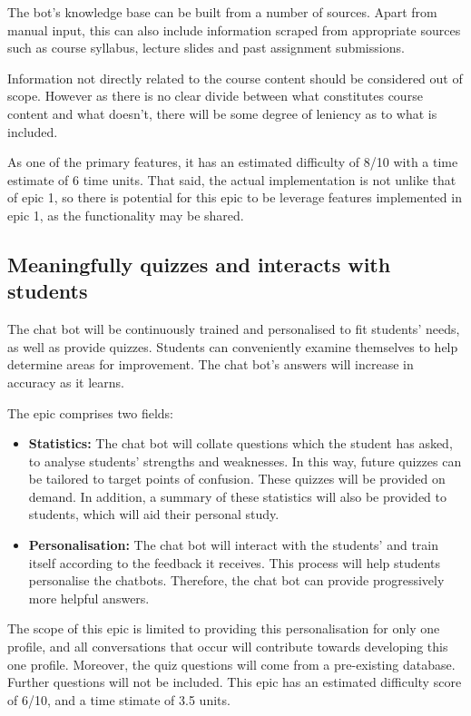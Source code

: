 \documentclass{article}
\begin{document}
The bot's knowledge base can be built from a number of sources. Apart from manual input, this can also include information scraped from appropriate sources such as course syllabus, lecture slides and past assignment submissions.

Information not directly related to the course content should be considered out of scope. However as there is no clear divide between what constitutes course content and what doesn't, there will be some degree of leniency as to what is included.

As one of the primary features, it has an estimated difficulty of 8/10 with a time estimate of 6 time units. That said, the actual implementation is not unlike that of epic 1, so there is potential for this epic to be leverage features implemented in  epic 1, as the functionality may be shared.

\subsection{Meaningfully quizzes and interacts with students}
The chat bot will be continuously trained and personalised to fit students' needs, as well as provide quizzes. Students can conveniently examine themselves to help determine areas for improvement. The chat bot's answers will increase in accuracy as it learns.

The epic comprises two fields:
\begin{itemize}
  \item \textbf{Statistics:} The chat bot will collate questions which the student has asked, to analyse students' strengths and weaknesses. In this way, future quizzes can be tailored to target points of confusion. These quizzes will be provided on demand. In addition, a summary of these statistics will also be provided to students, which will aid their personal study.
  \item \textbf{Personalisation:} The chat bot will interact with the students' and train itself according to the feedback it receives. This process will help students personalise the chatbots. Therefore, the chat bot can provide progressively more helpful answers.
\end{itemize}

The scope of this epic is limited to providing this personalisation for only one profile, and all conversations that occur will contribute towards developing this one profile. Moreover, the quiz questions will come from a pre-existing database. Further questions will not be included. This epic has an estimated difficulty score of 6/10, and a time stimate of 3.5 units.
\end{document}
